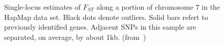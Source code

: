 \documentclass[12pt]{article}
\begin{document}
\begin{figure}
\begin{center}
\end{center}
\caption{Single-locus estimates of $F_{ST}$ along a portion of
  chromosome 7 in the HapMap data set. Black dots denote
  outliers. Solid bars refert to previously identified genes. Adjacent
  SNPs in this sample are separated, on average, by about
  1kb. (from~\cite{Guo-etal-2009})}\label{fig:high-res-SNP}
\end{figure}




\ccLicense
\end{document}
